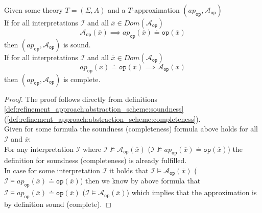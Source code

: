 \begin{lemma}
    Given some theory $T=\left(\Sigma,A\right)$ and a $T$-approximation $\left(ap_{\texttt{op}}, \mathcal{A}_{\texttt{op}}\right)$\\
    If for all interpretations $\mathcal{I}$ and all $\overline{x}\in Dom\left(\mathcal{A}_{\texttt{op}}\right)$
    \[
        \mathcal{A}_{\texttt{op}}\left(\overline{x}\right) \implies ap_{\texttt{op}}\left(\overline{x}\right) \doteq \texttt{op}\left(\overline{x}\right)
    \]
    then $\left(ap_{\texttt{op}}, \mathcal{A}_{\texttt{op}}\right)$ is sound.\\
    If for all interpretations $\mathcal{I}$ and all $\overline{x}\in Dom\left(\mathcal{A}_{\texttt{op}}\right)$
    \[
        ap_{\texttt{op}}\left(\overline{x}\right) \doteq \texttt{op}\left(\overline{x}\right) \implies \mathcal{A}_{\texttt{op}}\left(\overline{x}\right)
    \]
    then $\left(ap_{\texttt{op}}, \mathcal{A}_{\texttt{op}}\right)$ is complete.
    \begin{proof}
        The proof follows directly from definitions \ref{def:refinement_approach:abstraction_scheme:soundness} (\ref{def:refinement_approach:abstraction_scheme:completeness}).\\
        Given for some formula the soundness (completeness) formula above holds for all $\mathcal{I}$ and $\overline{x}$:\\
        For any interpretation $\mathcal{I}$ where
            $\mathcal{I}\nvDash\mathcal{A}_{\texttt{op}}\left(\overline{x}\right)$
            ($\mathcal{I}\nvDash ap_{\texttt{op}}\left(\overline{x}\right) \doteq \texttt{op}\left(\overline{x}\right)$)
            the definition for soundness (completeness) is already fulfilled.\\
        In case for some interpretation $\mathcal{I}$ it holds that 
            $\mathcal{I}\vDash\mathcal{A}_{\texttt{op}}\left(\overline{x}\right)$
            ($\mathcal{I}\vDash ap_{\texttt{op}}\left(\overline{x}\right) \doteq \texttt{op}\left(\overline{x}\right)$)
        then we know by above formula that
            $\mathcal{I}\vDash ap_{\texttt{op}}\left(\overline{x}\right) \doteq \texttt{op}\left(\overline{x}\right)$
            ($\mathcal{I}\vDash\mathcal{A}_{\texttt{op}}\left(\overline{x}\right)$)
        which implies that the approximation is by definition sound (complete).


    \end{proof}
\end{lemma}

